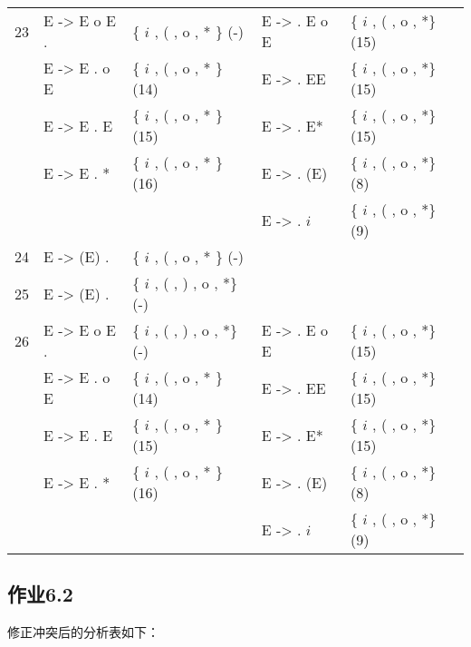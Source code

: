 \begin{center}
\begin{longtable}{c|ll|ll}
 \hline
23 &   E -> E o E .  & \{ $i$ , ( , o , *  \} (-)  & E ->  . E o E & \{ $i$ , ( , o , *\} (15)\\
 &   E -> E . o E & \{ $i$ , ( , o , *  \} (14)  & E ->  . EE  & \{ $i$ , ( , o , *\} (15)\\
 &   E -> E . E  & \{ $i$ , ( , o , *  \} (15)  & E ->  . E*  & \{ $i$ , ( , o , *\} (15)\\
 &   E -> E . *  & \{ $i$ , ( , o , *  \} (16)  & E ->  . (E) & \{ $i$ , ( , o , *\} (8)\\
 &              &                & E ->  . $i$   & \{ $i$ , ( , o , *\} (9)\\
\hline
24 &   E -> (E) .  & \{ $i$ , ( , o , *  \} (-)\\
\hline
25 &   E -> (E) .  & \{ $i$ , ( , ) , o , *\} (-)\\
\hline
26 &   E -> E o E .  & \{ $i$ , ( , ) , o , *\} (-)  & E ->  . E o E & \{ $i$ , ( , o , *\} (15)\\
 &   E -> E . o E & \{ $i$ , ( , o , *  \} (14)  & E ->  . EE  & \{ $i$ , ( , o , *\} (15)\\
 &   E -> E . E  & \{ $i$ , ( , o , *  \} (15)  & E ->  . E*  & \{ $i$ , ( , o , *\} (15)\\
 &   E -> E . *  & \{ $i$ , ( , o , *  \} (16)  & E ->  . (E) & \{ $i$ , ( , o , *\} (8)\\
 &              &                & E ->  . $i$   & \{ $i$ , ( , o , *\} (9)\\
 \bottomrule
    \end{longtable}
\end{center}

\subsection{作业6.2}

修正冲突后的分析表如下：


